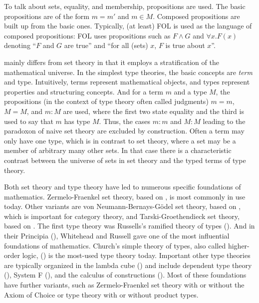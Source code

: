 To talk about sets, equality, and membership, propositions are used. The basic propositions are of the form $m=m'$ and $m\in M$. Composed propositions are built up from the basic ones. Typically, (at least) FOL is used as the language of composed propositions: FOL uses propositions such as $F\wedge G$ and $\forall x. F(x)$ denoting ``$F$ and $G$ are true'' and ``for all (sets) $x$, $F$ is true about $x$''.

 mainly differs from set theory in that it employs a stratification of the mathematical universe. In the simplest type theories, the basic concepts are \emph{term} and type. Intuitively, terms represent mathematical objects, and types represent properties and structuring concepts. And for a term $m$ and a type $M$, the propositions (in the context of type theory often called judgments) $m=m$, $M=M$, and $m:M$ are used, where the first two state equality and the third is used to say that $m$ has type $M$. Thus, the cases $m:m$ and $M:M$ leading to the paradoxon of naive set theory are excluded by construction. Often a term may only have one type, which is in contrast to set theory, where a set may be a member of arbitrary many other sets. In that case there is a characteristic contrast between the universe of sets in set theory and the typed terms of type theory.

Both set theory and type theory have led to numerous specific foundations of mathematics. Zermelo-Fraenkel set theory, based on \cite{zermelo,fraenkel}, is most commonly in use today. Other variants are von Neumann-Bernays-G\"odel set theory, based on \cite{vonneumann,bernays,goedelsettheory}, which is important for category theory, and Tarski-Groethendieck set theory, based on \cite{tarskisettheory,bourbakiunivers}. The first type theory was Russells's ramified theory of types (\cite{typetheoryrussell}). And in their Principia (\cite{principia}), Whitehead and Russell gave one of the most influential foundations of mathematics. Church's simple theory of types, also called higher-order logic, (\cite{churchtypes}) is the most-used type theory today. Important other type theories are typically organized in the lambda cube (\cite{lambdacube}) and include dependent type theory (\cite{martinlof,lf}), System F (\cite{sytemfgirard,systemfreynolds}), and the calculus of constructions (\cite{calcconstructions}). Most of these foundations have further variants, such as Zermelo-Fraenkel set theory with or without the Axiom of Choice or type theory with or without product types.

